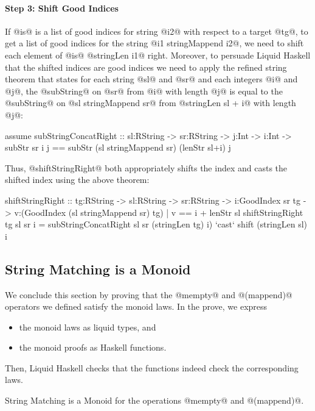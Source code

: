 \paragraph{Step 3: Shift Good Indices}
If @is@ is a list of good indices for string @i2@ with respect to a target @tg@,
to get a list of good indices for the string @i1 stringMappend i2@,
we need to shift each element of @is@ @stringLen i1@ right.
%
Moreover, to persuade Liquid Haskell that the shifted indices are good indices
we need to apply the refined string theorem that states
for each string @sl@ and @sr@
and each integers @i@ and @j@,
the @subString@ on @sr@ from @i@ with length @j@
is equal to
the @subString@ on @sl stringMappend sr@ from @stringLen sl + i@ with length @j@:
%
\begin{code}
assume subStringConcatRight
  :: sl:RString -> sr:RString
  -> j:Int -> i:Int
  -> {subStr sr i j == subStr (sl stringMappend sr) (lenStr sl+i) j}
\end{code}

Thus, @shiftStringRight@ both appropriately shifts the index
and casts the shifted index using the above theorem:
\begin{code}
shiftStringRight
  :: tg:RString -> sl:RString -> sr:RString
  -> i:GoodIndex sr tg
  -> {v:(GoodIndex (sl stringMappend sr) tg) | v == i + lenStr sl}
shiftStringRight tg sl sr i
  = subStringConcatRight sl sr (stringLen tg) i)
     `cast` shift (stringLen sl) i
\end{code}


\subsection{String Matching is a Monoid}
We conclude this section by proving
that the @mempty@ and @(mappend)@
operators we defined satisfy the monoid laws.
%
In the prove, we express
\begin{itemize}
\item the monoid laws as liquid types, and
\item the monoid proofs as Haskell functions.
\end{itemize}
Then, Liquid Haskell checks that the functions indeed check the corresponding laws.

\begin{theorem}\label{theorem:monoid}
String Matching is a Monoid for the operations @mempty@ and @(mappend)@.
\end{theorem}

